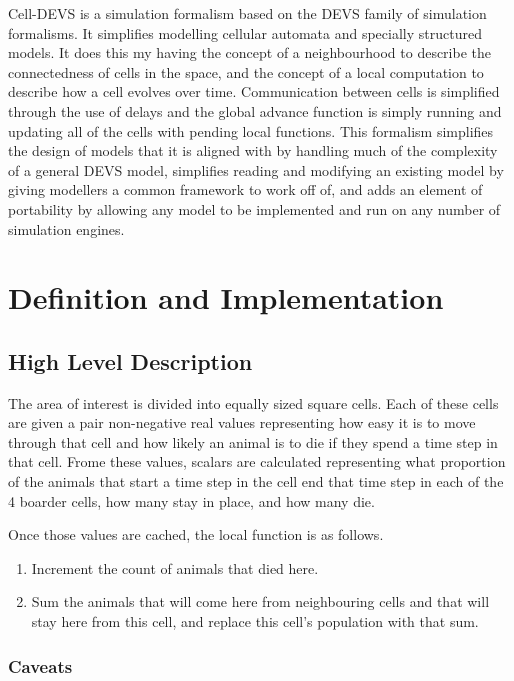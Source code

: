 \documentclass[twocolumn]{article}
\begin{document}
Cell-DEVS is a simulation formalism based on the DEVS family of simulation formalisms. It simplifies modelling cellular automata and specially structured models. It does this my having the concept of a neighbourhood to describe the connectedness of cells in the space, and the concept of a local computation to describe how a cell evolves over time. Communication between cells is simplified through the use of delays and the global advance function is simply running and updating all of the cells with pending local functions. This formalism simplifies the design of models that it is aligned with by handling much of the complexity of a general DEVS model, simplifies reading and modifying an existing model by giving modellers a common framework to work off of, and adds an element of portability by allowing any model to be implemented and run on any number of simulation engines.

\section{Definition and Implementation}

\subsection{High Level Description}

The area of interest is divided into equally sized square cells. Each of these cells are given a pair non-negative real values representing how easy it is to move through that cell and how likely an animal is to die if they spend a time step in that cell. Frome these values, scalars are calculated representing what proportion of the animals that start a time step in the cell end that time step in each of the 4 boarder cells, how many stay in place, and how many die. 

Once those values are cached, the local function is as follows.
\begin{enumerate}
	\item Increment the count of animals that died here.
	\item Sum the animals that will come here from neighbouring cells and that will stay here from this cell, and replace this cell's population with that sum.
\end{enumerate}
\subsubsection{Caveats}
\end{document}
